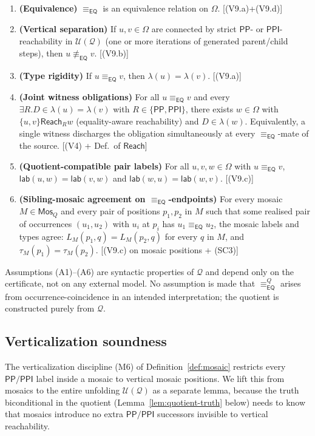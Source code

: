 \documentclass[11pt]{article}
\newcommand{\EQ}{\mathsf{EQ}}
\newcommand{\PP}{\mathsf{PP}}
\newcommand{\PPI}{\mathsf{PPI}}
\newcommand{\Q}{\mathcal Q}
\newcommand{\U}{\mathcal U}
\newcommand{\Mos}{\mathsf{Mos}}
\newcommand{\Reach}{\mathrel{\mathsf{Reach}}}
\newcommand{\eqc}{\equiv_{\EQ}}
\newcommand{\lab}{\mathsf{lab}}
\begin{document}
\begin{enumerate}[label=(A\arabic*),leftmargin=2em]
\item \textbf{(Equivalence)} $\eqc$ is an equivalence relation on $\Omega$.
\hfill [(V9.a)+(V9.d)]

\item \textbf{(Vertical separation)} If $u,v\in\Omega$ are connected by strict $\PP$- or $\PPI$-reachability in $\U(\Q)$ (one or more iterations of generated parent/child steps), then $u\not\eqc v$.
\hfill [(V9.b)]

\item \textbf{(Type rigidity)} If $u\eqc v$, then $\lambda(u)=\lambda(v)$.
\hfill [(V9.a)]

\item \textbf{(Joint witness obligations)} For all $u\eqc v$ and every $\exists R.D\in\lambda(u)=\lambda(v)$ with $R\in\{\PP,\PPI\}$, there exists $w\in\Omega$ with $\{u,v\}\Reach_R w$ (equality-aware reachability) and $D\in\lambda(w)$.  Equivalently, a single witness discharges the obligation simultaneously at every $\eqc$-mate of the source.
\hfill [(V4) + Def.~of $\Reach$]

\item \textbf{(Quotient-compatible pair labels)} For all $u,v,w\in\Omega$ with $u\eqc v$, $\lab(u,w)=\lab(v,w)$ and $\lab(w,u)=\lab(w,v)$.
\hfill [(V9.c)]

\item \textbf{(Sibling-mosaic agreement on $\eqc$-endpoints)} For every mosaic $M\in\Mos_Q$ and every pair of positions $p_1,p_2$ in $M$ such that some realised pair of occurrences $(u_1,u_2)$ with $u_i$ at $p_i$ has $u_1\eqc u_2$, the mosaic labels and types agree: $L_M(p_1,q)=L_M(p_2,q)$ for every $q$ in $M$, and $\tau_M(p_1)=\tau_M(p_2)$.
\hfill [(V9.c) on mosaic positions + (SC3)]
\end{enumerate}

Assumptions (A1)--(A6) are syntactic properties of $\Q$ and depend
only on the certificate, not on any external model.  No assumption
is made that $\eqc^Q$ arises from occurrence-coincidence in an
intended interpretation; the quotient is constructed purely from
$\Q$.

\subsection{Verticalization soundness}
\label{ssec:verticalization-soundness}

The verticalization discipline (M6) of
Definition~\ref{def:mosaic} restricts every $\PP/\PPI$ label inside
a mosaic to vertical mosaic positions.  We lift this from mosaics to
the entire unfolding $\U(\Q)$ as a separate lemma, because the
truth biconditional in the quotient (Lemma~\ref{lem:quotient-truth}
below) needs to know that mosaics introduce no extra $\PP/\PPI$
successors invisible to vertical reachability.
\end{document}
